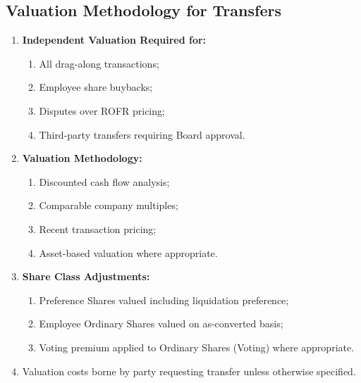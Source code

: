 \subsection{Valuation Methodology for Transfers}
\begin{enumerate}[label=(\alph*)]
\item \textbf{Independent Valuation Required for:}
    \begin{enumerate}[label=(\roman*)]
    \item All drag-along transactions;
    \item Employee share buybacks;
    \item Disputes over ROFR pricing;
    \item Third-party transfers requiring Board approval.
    \end{enumerate}
\item \textbf{Valuation Methodology:}
    \begin{enumerate}[label=(\roman*)]
    \item Discounted cash flow analysis;
    \item Comparable company multiples;
    \item Recent transaction pricing;
    \item Asset-based valuation where appropriate.
    \end{enumerate}
\item \textbf{Share Class Adjustments:}
    \begin{enumerate}[label=(\roman*)]
    \item Preference Shares valued including liquidation preference;
    \item Employee Ordinary Shares valued on as-converted basis;
    \item Voting premium applied to Ordinary Shares (Voting) where appropriate.
    \end{enumerate}
\item Valuation costs borne by party requesting transfer unless otherwise specified.
\end{enumerate}

